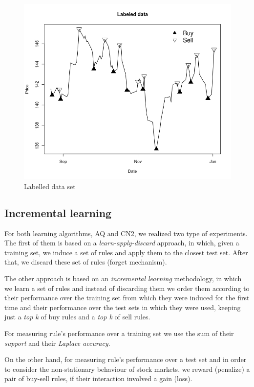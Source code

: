 \documentclass[preprint,3p,twocolumn]{elsarticle}
\begin{document}
\begin{figure}[h]
\centering\includegraphics[width=1\linewidth]{images/labelling.jpeg}
\caption{\label{figure:Labelling} Labelled data set}
\end{figure}

\subsection{Incremental learning}
For both learning algorithms, AQ and CN2, we realized two type of experiments. The first of them is based on a \textit{learn-apply-discard} approach, in which, given a training set, we induce a set of rules and apply them to the closest test set. After that, we discard these set of rules (forget mechanism).

The other approach is based on an \textit{incremental learning} methodology, in which we learn a set of rules and instead of discarding them we order them according to their performance over the training set from which they were induced for the first time and their performance over the test sets in which they were used, keeping just a \textit{top k} of buy rules and a \textit{top k} of sell rules.

For measuring rule's performance over a training set we use the sum of their \textit{support} and their \textit{Laplace accuracy}.

On the other hand, for measuring rule's performance over a test set and in order to consider the non-stationary behaviour of stock markets, we reward (penalize) a pair of buy-sell rules, if their interaction involved a gain (loss).
\end{document}
